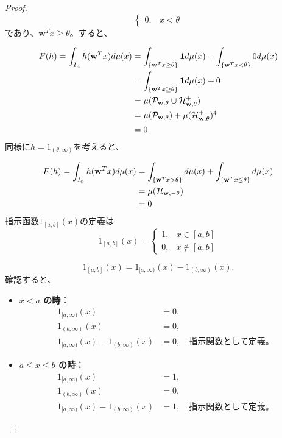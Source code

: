 \documentclass[a4paper]{jsarticle}%
\begin{document}
\begin{lem}
\begin{proof}
{\[\begin{cases}
0, & x < \theta
\end{cases}
\]}であり、$\mathbf{w}^T x\geq\theta$。すると、


\begin{align}
  F(h) = \int_{I_n} h(\mathbf{w}^T x) d\mu(x) &= \int_{\{\mathbf{w}^T x \geq \theta\}} \mathbf{1} d\mu(x)  +\int_{\{\mathbf{w}^T x < \theta\}} 0d\mu(x) \notag\\
  &= \int_{\{\mathbf{w}^T x \geq \theta\}} \mathbf{1}d\mu(x) + 0 \notag\\
  &=\mu(\mathcal{P}_{\mathbf{w},\theta}\cup\mathcal{H}_{\mathbf{w},\theta}^+) \notag\\
  &= \mu(\mathcal{P}_{\mathbf{w},\theta}) + \mu(\mathcal{H}_{\mathbf{w},\theta}^+)\footnotemark[4]\notag\\
  &= 0\notag
\end{align}
同様に$h = 1_{(\theta,\infty)}$を考えると、

\begin{align}
  F(h) = \int_{I_n} h(\mathbf{w}^T x) d\mu(x) &= \int_{\{\mathbf{w}^T x > \theta\}} d\mu(x)+\int_{\{\mathbf{w}^T x \leq \theta\}} d\mu(x)\notag \\
  &= \mu(\mathcal{H}_{\mathbf{w},-\theta}) \notag\\
  &= 0\notag
\end{align}
指示函数$1_{[a,b]}(x)$の定義は
$$
1_{[a,b]}(x) = 
\begin{cases}
1, & x \in [a,b] \\

0, & x \notin [a,b]
\end{cases}
$$

\[
1_{[a,b]}(x) = 1_{[a,\infty)}(x) - 1_{(b,\infty)}(x).
\]
確認すると、

\begin{itemize}
    \item \textbf{ $x < a$ の時：}
    \begin{align*}
    1_{[a,\infty)}(x) &= 0, \\
    1_{(b,\infty)}(x) &= 0,\\
    1_{[a,\infty)}(x) - 1_{(b,\infty)}(x) &= 0, \quad \text{指示関数として定義。}
    \end{align*}

    \item \textbf{ $a \leq x \leq b$ の時：}
    \begin{align*}
    1_{[a,\infty)}(x) &= 1, \\
    1_{(b,\infty)}(x) &= 0,\\
    1_{[a,\infty)}(x) - 1_{(b,\infty)}(x) &= 1, \quad \text{指示関数として定義。}
    \end{align*}


\end{itemize}
\end{proof}
\end{lem}
\end{document}
